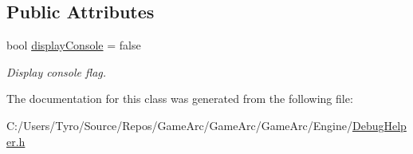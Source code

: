 \subsection*{Public Attributes}
\begin{DoxyCompactItemize}
\item 
\mbox{\label{class_debug_helper_a4353de086099b07a758df1ce5f44bed7}} 
bool \mbox{\hyperlink{class_debug_helper_a4353de086099b07a758df1ce5f44bed7}{display\+Console}} = false
\begin{DoxyCompactList}\small\item\em Display console flag. \end{DoxyCompactList}\end{DoxyCompactItemize}


The documentation for this class was generated from the following file\+:\begin{DoxyCompactItemize}
\item 
C\+:/\+Users/\+Tyro/\+Source/\+Repos/\+Game\+Arc/\+Game\+Arc/\+Game\+Arc/\+Engine/\mbox{\hyperlink{_debug_helper_8h}{Debug\+Helper.\+h}}\end{DoxyCompactItemize}
